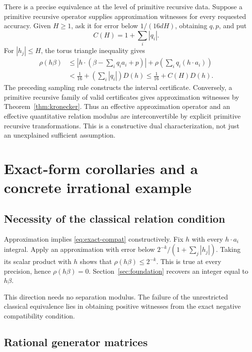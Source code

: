 \documentclass[11pt]{article}
\theoremstyle{definition}\newtheorem{definition}[theorem]{Definition}
\theoremstyle{remark}\newtheorem{remark}[theorem]{Remark}
\begin{document}
There is a precise equivalence at the level of primitive recursive data. Suppose a primitive recursive operator supplies approximation witnesses for every requested accuracy. Given $H\ge1$, ask it for error below $1/(16dH)$, obtaining $q,p$, and put
\[
 C(H)=1+\sum_i|q_i|.
\]
For $|h_j|\le H$, the torus triangle inequality gives
\begin{align*}
 \rho(h\beta)
 &\le\left|h\cdot\left(\beta-\sum_iq_i a_i+p\right)\right|
      +\rho\left(\sum_iq_i(h\cdot a_i)\right)\\
 &<\frac1{16}+\left(\sum_i|q_i|\right)D(h)
 \le\frac1{16}+C(H)D(h).
\end{align*}
The preceding sampling rule constructs the interval certificate. Conversely, a primitive recursive family of valid certificates gives approximation witnesses by Theorem~\ref{thm:kronecker}. Thus an effective approximation operator and an effective quantitative relation modulus are interconvertible by explicit primitive recursive transformations. This is a constructive dual characterization, not just an unexplained sufficient assumption.

\section{Exact-form corollaries and a concrete irrational example}\label{sec:corollaries}

\subsection{Necessity of the classical relation condition}

Approximation implies \eqref{eq:exact-compat} constructively. Fix $h$ with every $h\cdot a_i$ integral. Apply an approximation with error below $2^{-k}/(1+\sum_j|h_j|)$. Taking its scalar product with $h$ shows that $\rho(h\beta)\le2^{-k}$. This is true at every precision, hence $\rho(h\beta)=0$. Section~\ref{sec:foundation} recovers an integer equal to $h\beta$.

This direction needs no separation modulus. The failure of the unrestricted classical equivalence lies in obtaining positive witnesses from the exact negative compatibility condition.

\subsection{Rational generator matrices}
\end{document}
